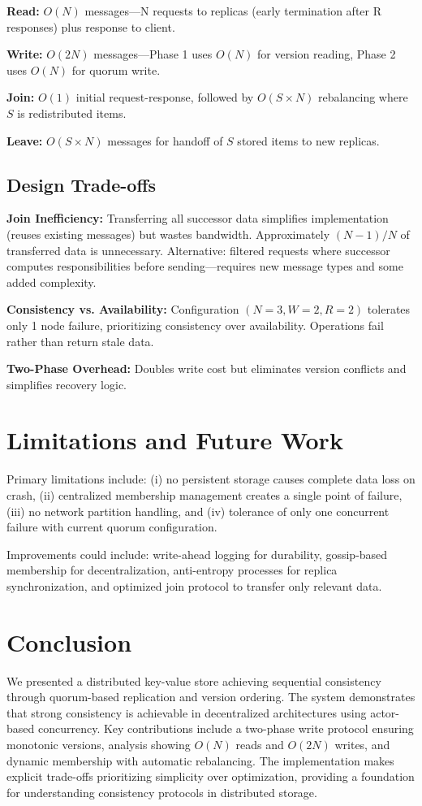 \documentclass{article}
\begin{document}
\textbf{Read:} $O(N)$ messages—N requests to replicas (early termination after R responses) plus response to client.

\textbf{Write:} $O(2N)$ messages—Phase 1 uses $O(N)$ for version reading, Phase 2 uses $O(N)$ for quorum write.

\textbf{Join:} $O(1)$ initial request-response, followed by $O(S \times N)$ rebalancing where $S$ is redistributed items.

\textbf{Leave:} $O(S \times N)$ messages for handoff of $S$ stored items to new replicas.

\subsection{Design Trade-offs}

\textbf{Join Inefficiency:} Transferring all successor data simplifies implementation (reuses existing messages) but wastes bandwidth. Approximately $(N-1)/N$ of transferred data is unnecessary. Alternative: filtered requests where successor computes responsibilities before sending—requires new message types and some added complexity.

\textbf{Consistency vs. Availability:} Configuration $(N=3, W=2, R=2)$ tolerates only 1 node failure, prioritizing consistency over availability. Operations fail rather than return stale data.

\textbf{Two-Phase Overhead:} Doubles write cost but eliminates version conflicts and simplifies recovery logic.

\section{Limitations and Future Work}

Primary limitations include: (i) no persistent storage causes complete data loss on crash, (ii) centralized membership management creates a single point of failure, (iii) no network partition handling, and (iv) tolerance of only one concurrent failure with current quorum configuration.

Improvements could include: write-ahead logging for durability, gossip-based membership for decentralization, anti-entropy processes for replica synchronization, and optimized join protocol to transfer only relevant data.

\section{Conclusion}

We presented a distributed key-value store achieving sequential consistency through quorum-based replication and version ordering. The system demonstrates that strong consistency is achievable in decentralized architectures using actor-based concurrency. Key contributions include a two-phase write protocol ensuring monotonic versions, analysis showing $O(N)$ reads and $O(2N)$ writes, and dynamic membership with automatic rebalancing. The implementation makes explicit trade-offs prioritizing simplicity over optimization, providing a foundation for understanding consistency protocols in distributed storage.
\end{document}
